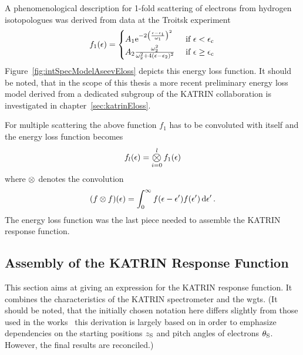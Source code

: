 A phenomenological description for 1-fold scattering of electrons from hydrogen isotopologues was derived from data at the Troitsk experiment~\cite{Aseev2000, Abdurashitov2017}
\begin{equation}
\label{eq:intSpecModelAseevEloss}
	f_1(\epsilon) =
	\begin{cases}
		A_1 
		\mathrm{e}^{ 
			-2\left(
			\frac{\epsilon-\epsilon_1}{\omega_1}
			\right)^2
		}
		&\text{ if } \epsilon < \epsilon_\mathrm{c} \\
		A_2\frac{
			\omega_2^2
		}{
			\omega_2^2+4(\epsilon-\epsilon_2)^2
		} 
		&\text{ if } \epsilon \geq \epsilon_\mathrm{c}
	\end{cases}
\end{equation}
Figure~\ref{fig:intSpecModelAseevEloss} depicts this energy loss function. It should be noted, that in the scope of this thesis a more recent preliminary energy loss model derived from a dedicated subgroup of the KATRIN collaboration is investigated in chapter~\ref{sec:katrinEloss}.

For multiple scattering the above function $f_1$ has to be convoluted with itself and the energy loss function becomes~\cite{Kleesiek2019}
\begin{equation}
	\label{eq:intSpecModelConvolutedEloss}
	f_l(\epsilon) = \Conv_{i=0}^{l} f_1(\epsilon)
\end{equation}
where $\otimes$ denotes the convolution
\begin{equation}
(f \otimes f)(\epsilon) = 
\int_{0}^{\infty}  
	f(\epsilon-\epsilon^\prime)f(\epsilon^\prime)
\mathop{}\!\mathrm{d} \epsilon^\prime 
\text{\,.} 
\end{equation}
The energy loss function was the last piece needed to assemble the KATRIN response function. 

\subsection{Assembly of the KATRIN Response Function}
\label{sec:intSpecModelResponseReconciliation}
This section aims at giving an expression for the KATRIN response function. It combines the characteristics of the KATRIN spectrometer and the \gls{wgts}. (It should be noted, that the initially chosen notation here differs slightly from those used in the works~\cite{Groh2015,Kleesiek2019} this derivation is largely based on in order to emphasize dependencies on the starting positions $z_\mathrm{S}$ and pitch angles of electrons $\theta_\mathrm{S}$. However, the final results are reconciled.)

